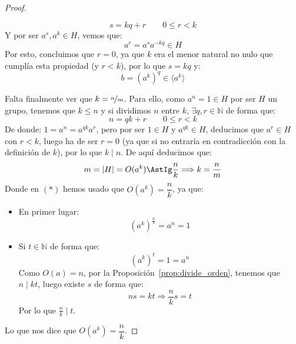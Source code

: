 \begin{prop}
\begin{proof}
\begin{description}
                \begin{equation*}
                    s = kq + r \qquad 0\leq r < k
                \end{equation*}
                Y por ser $a^s, a^k\in H$, vemos que:
                \begin{equation*}
                    a^r = a^s a^{-kq} \in H
                \end{equation*}
                Por esto, concluimos que $r=0$, ya que $k$ era el menor natural no nulo que cumplía esta propiedad (y $r<k$), por lo que $s = kq$ y:
                \begin{equation*}
                    b = {(a^k)}^{q} \in \langle a^k \rangle 
                \end{equation*}
        \end{description}
        Falta finalmente ver que $k = \nicefrac{n}{m}$. Para ello, como $a^n = 1 \in H$ por ser $H$ un grupo, tenemos que $k\leq n$ y si dividimos $n$ entre $k$, $\exists q,r \in \mathbb{N}$ de forma que:
        \begin{equation*}
            n = qk + r \qquad 0\leq r < k
        \end{equation*}
        De donde: $1 = a^n = a^{qk}a^r$, pero por ser $1\in H$ y $a^{qk}\in H$, deducimos que $a^r \in H$ con $r<k$, luego ha de ser $r=0$ (ya que si no entraría en contradicción con la definición de $k$), por lo que $k\mid n$. De aquí deducimos que:
        \begin{equation*}
             m = |H| = O(a^k)\AstIg \dfrac{n}{k} \Longrightarrow k = \dfrac{n}{m}
        \end{equation*}
        Donde en $(\ast)$ hemos usado que $O(a^k) = \dfrac{n}{k}$, ya que:
        \begin{itemize}
            \item En primer lugar:
                \begin{equation*}
                    {(a^k)}^{\frac{n}{k}} = a^n = 1
                \end{equation*}
            \item Si $t\in \mathbb{N}$ de forma que:
                \begin{equation*}
                    {(a^k)}^{t} = 1 = a^n
                \end{equation*}
                Como $O(a)=n$, por la Proposición~\ref{prop:divide_orden}, tenemos que $n\mid kt$, luego existe $s$ de forma que:
                \begin{equation*}
                    ns = kt \Longrightarrow \dfrac{n}{k}s = t
                \end{equation*}
                Por lo que $\frac{n}{k}\mid t$.
        \end{itemize}
        Lo que nos dice que $O(a^k) = \dfrac{n}{k}$.
    \end{proof}
\end{prop}

